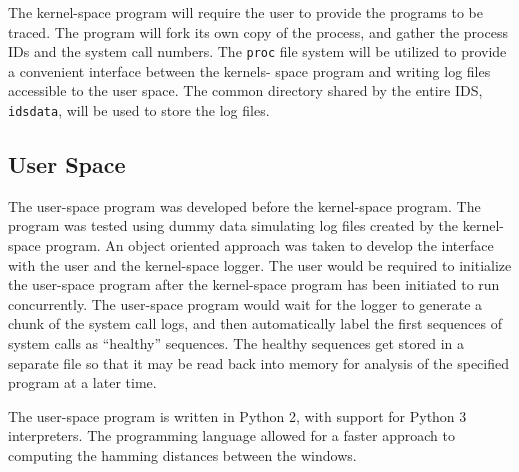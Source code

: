 \documentclass[paper=usletter, fontsize=12pt]{article}
\begin{document}
    The kernel-space program will require the user to provide the programs to
    be traced. The program will fork its own copy of the process, and gather
    the process IDs and the system call numbers. The \texttt{proc} file system
    will be utilized to provide a convenient interface between the kernels-
    space program and writing log files accessible to the user space. The
    common directory shared by the entire IDS, \texttt{idsdata}, will be used
    to store the log files.

    \subsection{User Space} The user-space program was developed before the
    kernel-space program. The program was tested using dummy data simulating
    log files created by the kernel-space program. An object oriented approach
    was taken to develop the interface with the user and the kernel-space
    logger. The user would be required to initialize the user-space program
    after the kernel-space program has been initiated to run concurrently. The
    user-space program would wait for the logger to generate a chunk of the
    system call logs, and then automatically label the first sequences of
    system calls as ``healthy'' sequences. The healthy sequences get stored in
    a separate file so that it may be read back into memory for analysis of the
    specified program at a later time.



    The user-space program is written in Python 2, with support for Python 3
    interpreters. The programming language allowed for a faster approach to
    computing the hamming distances between the windows.
\end{document}
